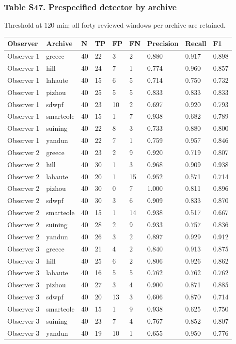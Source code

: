 \documentclass[a4paper,11pt]{article}
\newcounter{none}
\begin{document}
\subsubsection{Table S47. Prespecified detector by archive}\label{table-s47.-prespecified-detector-by-archive}

Threshold at 120 min; all forty reviewed windows per archive are retained.

{\def\LTcaptype{none} %
\begin{longtable}[]{@{}lllllllll@{}}
\toprule\noalign{}
Observer & Archive & N & TP & FP & FN & Precision & Recall & F1 \\
\midrule\noalign{}
\endhead
\bottomrule\noalign{}
\endlastfoot
Observer 1 & greece & 40 & 22 & 3 & 2 & 0.880 & 0.917 & 0.898 \\
Observer 1 & hill & 40 & 24 & 7 & 1 & 0.774 & 0.960 & 0.857 \\
Observer 1 & lahaute & 40 & 15 & 6 & 5 & 0.714 & 0.750 & 0.732 \\
Observer 1 & pizhou & 40 & 25 & 5 & 5 & 0.833 & 0.833 & 0.833 \\
Observer 1 & sdwpf & 40 & 23 & 10 & 2 & 0.697 & 0.920 & 0.793 \\
Observer 1 & smarteole & 40 & 15 & 1 & 7 & 0.938 & 0.682 & 0.789 \\
Observer 1 & suining & 40 & 22 & 8 & 3 & 0.733 & 0.880 & 0.800 \\
Observer 1 & yandun & 40 & 22 & 7 & 1 & 0.759 & 0.957 & 0.846 \\
Observer 2 & greece & 40 & 23 & 2 & 9 & 0.920 & 0.719 & 0.807 \\
Observer 2 & hill & 40 & 30 & 1 & 3 & 0.968 & 0.909 & 0.938 \\
Observer 2 & lahaute & 40 & 20 & 1 & 15 & 0.952 & 0.571 & 0.714 \\
Observer 2 & pizhou & 40 & 30 & 0 & 7 & 1.000 & 0.811 & 0.896 \\
Observer 2 & sdwpf & 40 & 30 & 3 & 6 & 0.909 & 0.833 & 0.870 \\
Observer 2 & smarteole & 40 & 15 & 1 & 14 & 0.938 & 0.517 & 0.667 \\
Observer 2 & suining & 40 & 28 & 2 & 9 & 0.933 & 0.757 & 0.836 \\
Observer 2 & yandun & 40 & 26 & 3 & 2 & 0.897 & 0.929 & 0.912 \\
Observer 3 & greece & 40 & 21 & 4 & 2 & 0.840 & 0.913 & 0.875 \\
Observer 3 & hill & 40 & 25 & 6 & 2 & 0.806 & 0.926 & 0.862 \\
Observer 3 & lahaute & 40 & 16 & 5 & 5 & 0.762 & 0.762 & 0.762 \\
Observer 3 & pizhou & 40 & 27 & 3 & 4 & 0.900 & 0.871 & 0.885 \\
Observer 3 & sdwpf & 40 & 20 & 13 & 3 & 0.606 & 0.870 & 0.714 \\
Observer 3 & smarteole & 40 & 15 & 1 & 9 & 0.938 & 0.625 & 0.750 \\
Observer 3 & suining & 40 & 23 & 7 & 4 & 0.767 & 0.852 & 0.807 \\
Observer 3 & yandun & 40 & 19 & 10 & 1 & 0.655 & 0.950 & 0.776 \\
\end{longtable}
}
\end{document}
